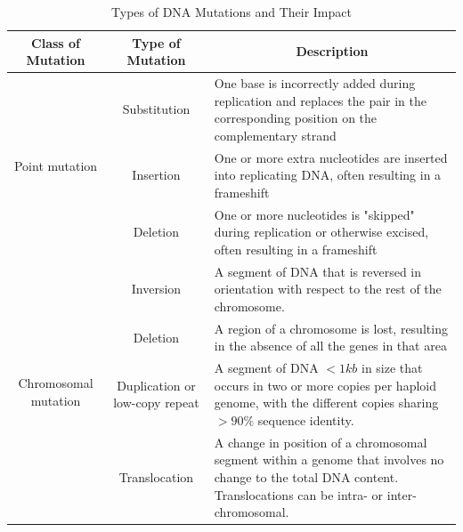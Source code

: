  \begin{landscape}
 \bgroup
 \def\arraystretch{2.0}%

 \begin{table}[]
 \centering
 \small
 \caption[Types of DNA Mutations and Their Impact]{Types of DNA Mutations and Their Impact \cite{comis_cnv,clancy2008genetic,feuk2006structural}}
 \label{mutation}
 \begin{tabular}{p{4cm}c|p{13cm}}
 \hline \hline
 \multicolumn{1}{c}{\textbf{Class of Mutation}} & \multicolumn{1}{c}{\textbf{Type of Mutation}} & \multicolumn{1}{c}{\textbf{Description}}  \\ \hline \hline
\multicolumn{1}{c|}{\multirow{3}{*}{\parbox{3cm}{\vspace{1.2cm} Point mutation}}}
& Substitution  & One base is incorrectly added during replication and replaces the pair in the corresponding position on the complementary strand \\  \cline{2-3}
\multicolumn{1}{c|}{}                                       & Insertion                                     & One or more extra nucleotides are inserted into replicating DNA, often resulting in a frameshift                                 \\  \cline{2-3}
\multicolumn{1}{c|}{}                                       & Deletion                                      & One or more nucleotides is "skipped" during replication or otherwise excised, often resulting in a frameshift                  \\ \hline
\multicolumn{1}{c|}{\multirow{4}{*}{\parbox{4cm}{\vspace{1.2cm} Chromosomal mutation}}}  &
Inversion  & A segment of DNA that is reversed in orientation with respect to the rest of the chromosome. \\  \cline{2-3}
\multicolumn{1}{l|}{}    & Deletion & A region of a chromosome is lost,
resulting in the absence of all the genes in that area      \\  \cline{2-3}
\multicolumn{1}{l|}{}    & Duplication   or low-copy repeat   & A segment of DNA $<1 kb$ in size that occurs in two or more copies per haploid genome, with the different copies sharing $>90\%$ sequence identity.  \\  \cline{2-3}
\multicolumn{1}{l|}{}    & Translocation   &  A change in position of a chromosomal segment within a genome that involves no change to the total DNA content. Translocations can be intra- or inter- chromosomal.   \\ \hline

\end{tabular}
\end{table}
\end{landscape}
